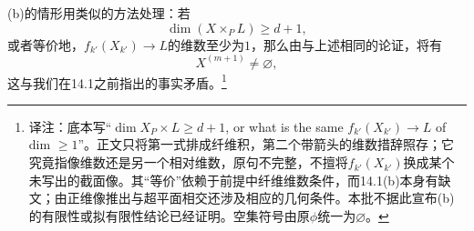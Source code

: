 \documentclass[openany,fontset=fandol]{ctexbook}
\newcommand{\note}[1]{\footnote{译注：#1}}
\begin{document}
\newpage
(b)的情形用类似的方法处理：若
\[
\dim(X\times_P L)\geq d+1,
\]
或者等价地，$f_{k'}(X_{k'})\to L$的维数至少为$1$，那么由与上述相同的论证，将有
\[
X^{(m+1)}\ne\varnothing,
\]
这与我们在14.1之前指出的事实矛盾。\note{底本写“$\dim X_P\times L\geq d+1$, or what is the same $f_{k'}(X_{k'})\to L$ of dim $\geq1$”。正文只将第一式排成纤维积，第二个带箭头的维数措辞照存；它究竟指像维数还是另一个相对维数，原句不完整，不擅将$f_{k'}(X_{k'})$换成某个未写出的截面像。其“等价”依赖于前提中纤维维数条件，而14.1(b)本身有缺文；由正维像推出与超平面相交还涉及相应的几何条件。本批不据此宣布(b)的有限性或拟有限性结论已经证明。空集符号由原$\phi$统一为$\varnothing$。}
\end{document}
